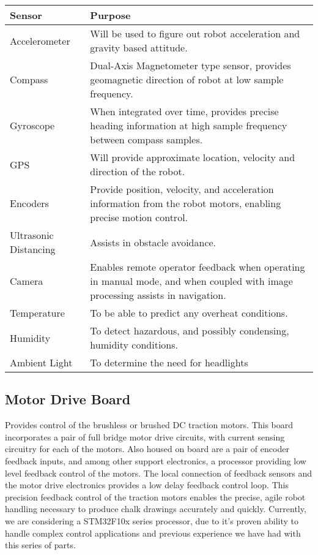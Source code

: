 \documentclass{article}
\begin{document}
\begin{center}
\begin{tabular}{|l| p{10cm} |}
\hline
Sensor & Purpose \\ \hline
Accelerometer & Will be used to figure out robot acceleration and gravity based attitude. \\ \hline
Compass & Dual-Axis Magnetometer type sensor, provides geomagnetic direction of robot at low sample frequency. \\ \hline
Gyroscope & When integrated over time, provides precise heading information at high sample frequency between compass samples. \\ \hline
GPS & Will provide approximate location, velocity and direction of the robot. \\ \hline
Encoders & Provide position, velocity, and acceleration information from the robot motors, enabling precise motion control. \\ \hline
Ultrasonic Distancing  & Assists in obstacle avoidance. \\ \hline
Camera & Enables remote operator feedback when operating in manual mode, and when coupled with image processing assists in navigation. \\ \hline
Temperature & To be able to predict any overheat conditions. \\ \hline
Humidity & To detect hazardous, and possibly condensing, humidity conditions. \\ \hline
Ambient Light & To determine the need for headlights \\ 
\hline
\end{tabular}
\end{center}

\subsection{Motor Drive Board}
Provides control of the brushless or brushed DC traction motors. This board incorporates a pair of full bridge motor drive circuits, with current sensing circuitry for each of the motors. Also housed on board are a pair of encoder feedback inputs, and among other support electronics, a processor providing low level feedback control of the motors. The local connection of feedback sensors and the motor drive electronics provides a low delay feedback control loop. This precision feedback control of the traction motors enables the precise, agile robot handling necessary to produce chalk drawings accurately and quickly. Currently, we are considering a STM32F10x series processor, due to it's proven ability to handle complex control applications and previous experience we have had with this series of parts.
\end{document}

